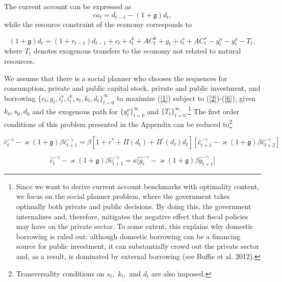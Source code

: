 \documentclass[11pt]{article}
\begin{document}
The current account can be expressed as%
\begin{equation}
ca_{t}=d_{t-1}-(1+\mathfrak{g})d_{t},  \label{CA}
\end{equation}%
while the resource constraint of the economy corresponds to

\begin{equation}
(1+\mathfrak{g}%
)d_{t}=(1+r_{t-1})d_{t-1}+c_{t}+i_{t}^{k}+AC_{t}^{k}+g_{t}+i_{t}^{s}+AC_{t}^{s}-y_{t}^{n}-y_{t}^{o}-T_{t},
\label{6}
\end{equation}%
where $T_{t}$ denotes exogenous transfers to the economy not related to
natural resources.

We assume that there is a social planner who chooses the sequences for
consumption, private and public capital stock, private and public
investment, and borrowing $%
\{c_{t},g_{t},i_{t}^{s},i_{t}^{k},s_{t},k_{t},d_{t}\}_{t=0}^{\infty }$ to
maximize (\ref{1}) subject to (\ref{2})-(\ref{6}), given $k_{0},s_{0},d_{0}$
and the exogenous path for $\{y_{t}^{o}\}_{t=0}^{\infty }$ and $%
\{T_{t}\}_{t=0}^{\infty }$.\footnote{%
Since we want to derive current account benchmarks with optimality content,
we focus on the social planner problem, where the government takes optimally
both private and public decisions. By doing this, the government
internalizes and, therefore, mitigates the negative effect that fiscal
policies may have on the private sector. To some extent, this explains why
domestic borrowing is ruled out: although domestic borrowing can be a
financing source for public investment, it can substantially crowd out the
private sector and, as a result, is dominated by external borrowing (see
Buffie et al. 2012).} The first order conditions of this problem presented
in the Appendix can be reduced to\footnote{%
Transversality conditions on $s_{t},$ $k_{t},$ and $d_{t}$ are also imposed.}

\begin{equation}
\hat{c}_{t}^{-\gamma }-\varkappa (1+\mathfrak{g})\beta \hat{c}%
_{t+1}^{-\gamma }=\beta \left[ 1+r^{\ast }+\Pi (d_{t})+\Pi ^{\prime
}(d_{t})d_{t}\right] \left[ \hat{c}_{t+1}^{-\gamma }-\varkappa (1+\mathfrak{g%
})\beta \hat{c}_{t+2}^{-\gamma }\right]  \label{EE1}
\end{equation}

\begin{equation}
\hat{c}_{t}^{-\gamma }-\varkappa (1+\mathfrak{g})\beta \hat{c}%
_{t+1}^{-\gamma }=\kappa \lbrack \hat{g}_{t}^{-\gamma }-\varkappa (1+%
\mathfrak{g})\beta \hat{g}_{t+1}^{-\gamma }]  \label{EE2}
\end{equation}
\end{document}
